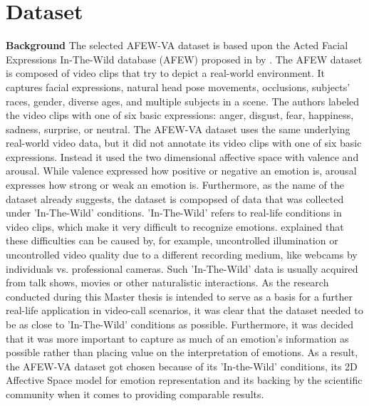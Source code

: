 \section{Dataset}
\textbf{Background}
\newline
The selected AFEW-VA dataset \citet{Kossaifi:2017:AFEW-VADatabase} is based upon the Acted Facial Expressions In-The-Wild database (AFEW) proposed in \citeyear{Dhall:2012:AFEW} by \citet{Dhall:2012:AFEW}. The AFEW dataset is composed of video clips that try to depict a real-world environment. It captures facial expressions, natural head pose movements, occlusions, subjects' races, gender, diverse ages, and multiple subjects in a scene. The authors labeled the video clips with one of six basic expressions: anger, disgust, fear, happiness, sadness, surprise, or neutral.
\newline\newline
The AFEW-VA dataset \citep{Kossaifi:2017:AFEW-VADatabase} uses the same underlying real-world video data, but it did not annotate its video clips with one of six basic expressions. Instead it used the two dimensional affective space with valence and arousal. While valence expressed how positive or negative an emotion is, arousal expresses how strong or weak an emotion is.
\newline\newline
Furthermore, as the name of the dataset already suggests, the dataset is compopsed of data that was collected under 'In-The-Wild' conditions. 'In-The-Wild' refers to real-life conditions in video clips, which make it very difficult to recognize emotions. \citet{Salah:2018:VideoBasedER} explained that these difficulties can be caused by, for example, uncontrolled illumination or uncontrolled video quality due to a different recording medium, like webcams by individuals vs. professional cameras. Such 'In-The-Wild' data is usually acquired from talk shows, movies or other naturalistic interactions. 
\newline\newline
As the research conducted during this Master thesis is intended to serve as a basis for a further real-life application in video-call scenarios, it was clear that the dataset needed to be as close to 'In-The-Wild' conditions as possible. Furthermore, it was decided that it was more important to capture as much of an emotion's information as possible rather than placing value on the interpretation of emotions. As a result, the AFEW-VA dataset got chosen because of its 'In-the-Wild' conditions, its 2D Affective Space model for emotion representation and its backing by the scientific community when it comes to providing comparable results.
